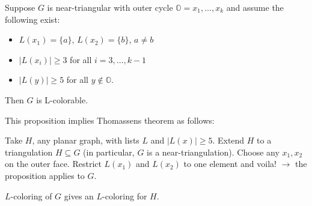 \begin{proposition}
Suppose $G$ is near-triangular with outer cycle $\mathbb{O}=x_1,\ldots,x_k$ and assume the following exist:
\begin{itemize}
\item $L(x_1)=\{a\}$, $L(x_2)=\{b\}$, $a\neq b$
\item $|L(x_i)|\geq 3$ for all $i=3,\ldots,k-1$
\item $|L(y)|\geq 5$ for all $y\notin \mathbb{O}$.
\end{itemize}
Then $G$ is L-colorable.
\end{proposition}

\begin{remark}
This proposition implies Thomassens theorem as follows:

Take $H$, any planar graph, with lists $L$ and $|L(x)| \geq 5$. Extend $H$ to a triangulation $H\subseteq G$ (in particular, $G$ is a near-triangulation). Choose any $x_1,x_2$ on the outer face. Restrict $L(x_1)$ and $L(x_2)$ to one element and voila! $\rightarrow$ the proposition applies to $G$. 

$L$-coloring of $G$ gives an $L$-coloring for $H$.
\end{remark}

